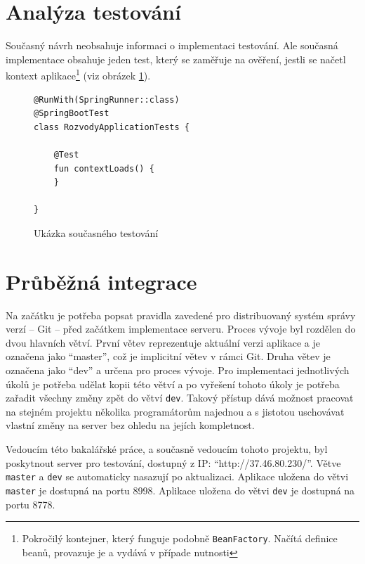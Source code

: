 \section{Analýza testování}\label{analyza:testovani}
    Současný návrh neobsahuje informaci o implementaci testování. Ale současná implementace obsahuje jeden test, který se zaměřuje na ověření, jestli se načetl {kontext aplikace}\footnote{Pokročilý kontejner, který funguje podobně \texttt{BeanFactory}. Načítá definice beanů, provazuje je a vydává v případe nutnosti} (viz obrázek \ref{code:test-context-loads1}).
    \begin{figure}
    \begin{verbatim}
@RunWith(SpringRunner::class)
@SpringBootTest
class RozvodyApplicationTests {

    @Test
    fun contextLoads() {
    }

}
        \end{verbatim}
        \caption{Ukázka současného testování} 
        \label{code:test-context-loads1}
        \end{figure}
        
\section{Průběžná integrace}\label{analyza:ci}
    Na začátku je potřeba popsat pravidla zavedené pro distribuovaný systém správy verzí -- Git -- před začátkem implementace serveru. Proces vývoje byl rozdělen do dvou hlavních větví. První větev reprezentuje aktuální verzi aplikace a je označena jako \enquote{master}, což je implicitní větev v rámci Git. Druha větev je označena jako \enquote{dev} a určena pro proces vývoje. Pro implementaci jednotlivých úkolů je potřeba udělat kopii této větví a po vyřešení tohoto úkoly je potřeba zařadit všechny změny zpět do větví \verb|dev|. Takový přístup dává možnost pracovat na stejném projektu několika programátorům najednou a s jistotou uschovávat vlastní změny na server bez ohledu na jejích kompletnost.
    
    Vedoucím této bakalářské práce, a současně vedoucím tohoto projektu, byl poskytnout server pro testování, dostupný z IP: \enquote{http://37.46.80.230/}. Větve \verb|master| a \verb|dev| se automaticky nasazují po aktualizaci. Aplikace uložena do větvi \verb|master| je dostupná na portu 8998. Aplikace uložena do větvi \verb|dev| je dostupná na portu 8778.